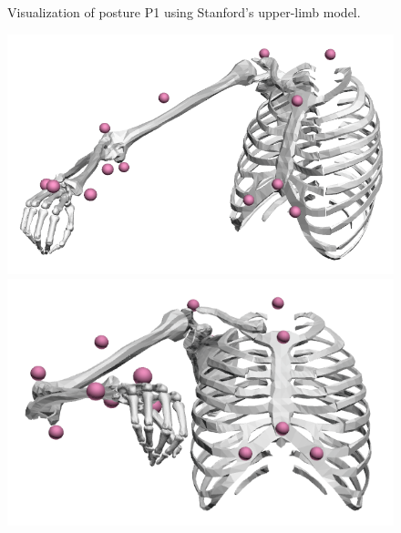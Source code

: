 \begin{figure}[!htb]
\begin{minipage}{0.3\linewidth}
    \end{minipage}
    \caption{Visualization of posture P1 using Stanford's upper-limb model.}
    \label{fig:exp_pose1}
\end{figure}

\begin{figure}[!htb]
    \centering
    \captionsetup{justification=centering}
    \begin{minipage}{0.3\linewidth}
        \centering
        \includegraphics[trim={0 0 0 0}, clip, width=1\linewidth]{img/chapter_5/posture2_3D.png}
    \end{minipage}
    \hfill
    \begin{minipage}{0.3\linewidth}
        \captionsetup{justification=centering}
        \centering
        \includegraphics[trim={0 0 0 0}, clip, width=0.95\linewidth]{img/chapter_5/posture2_coronal.png}
    \end{minipage}
    \hfill
    \begin{minipage}{0.3\linewidth}
        \captionsetup{justification=centering}

\end{minipage}
\end{figure}
